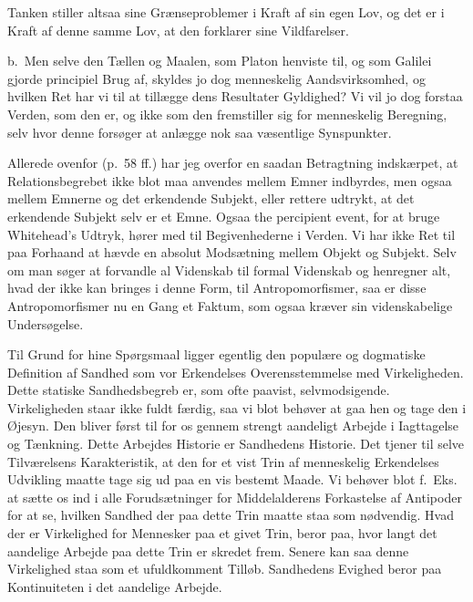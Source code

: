 \documentclass[12pt]{article}
\newcommand{\opage}[1]{\marginnote{\footnotesize\textit{[#1]}}}
\begin{document}
Tanken stiller altsaa sine Grænseproblemer i Kraft af sin egen Lov, og det
er i Kraft af denne samme Lov, at den forklarer sine Vildfarelser.

b.~Men selve den Tællen og Maalen, som Platon henviste til, og som Galilei
gjorde principiel Brug af, skyldes jo dog menneskelig Aandsvirksomhed, og
hvilken Ret har vi til at tillægge dens Resultater Gyldighed? Vi vil jo dog
forstaa Verden, som den er, og ikke som den fremstiller sig for menneskelig
Beregning, selv hvor denne forsøger at anlægge nok saa væsentlige
Synspunkter.

Allerede ovenfor (p.~58 ff.) har jeg overfor en saadan Betragtning
indskærpet, at Relationsbegrebet ikke blot maa anvendes mellem Emner
indbyrdes, men ogsaa mellem Emnerne og det erkendende Subjekt, eller
rettere udtrykt,
\opage{104} at det erkendende Subjekt selv er et Emne. Ogsaa \guillemotright the
percipient event\guillemotleft, for at bruge Whitehead's Udtryk, hører med
til Begivenhederne i Verden. Vi har ikke Ret til paa Forhaand at hævde en
absolut Modsætning mellem Objekt og Subjekt. Selv om man søger at forvandle
al Videnskab til formal Videnskab og henregner alt, hvad der ikke kan
bringes i denne Form, til \guillemotright
Antropomorfismer\guillemotleft, saa er disse Antropomorfismer nu en Gang
et Faktum, som ogsaa kræver sin videnskabelige Undersøgelse.

Til Grund for hine Spørgsmaal ligger egentlig den populære og dogmatiske
Definition af Sandhed som vor Erkendelses Overensstemmelse med
Virkeligheden. Dette statiske Sandhedsbegreb er, som ofte paavist,
selvmodsigende. Virkeligheden staar ikke fuldt færdig, saa vi blot behøver
at gaa hen og tage den i Øjesyn. Den bliver først til for os gennem strengt
aandeligt Arbejde i Iagttagelse og Tænkning. Dette Arbejdes Historie er
Sandhedens Historie. Det tjener til selve Tilværelsens Karakteristik, at
den for et vist Trin af menneskelig Erkendelses Udvikling maatte tage sig
ud paa en vis bestemt Maade. Vi behøver blot f.~Eks. at sætte os ind i alle
Forudsætninger for Middelalderens Forkastelse af Antipoder for at se,
hvilken Sandhed der paa dette Trin maatte staa som nødvendig. Hvad der er
Virkelighed for Mennesker paa et givet Trin, beror paa, hvor langt det
aandelige Arbejde paa dette Trin er skredet frem. Senere kan saa denne
Virkelighed staa som et ufuldkomment Tilløb. Sandhedens Evighed beror paa
Kontinuiteten i det aandelige Arbejde.
\end{document}
